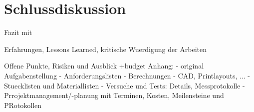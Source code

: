 \section{Schlussdiskussion}

Fazit mit

Erfahrungen, Lessons Learned, kritische Wuerdigung der Arbeiten

Offene Punkte, Risiken und Ausblick
+budget
Anhang:
- original Aufgabenstellung
- Anforderungslisten
- Berechnungen
- CAD, Printlayouts, ...
- Stuecklisten und Materiallisten
- Versuche und Tests: Details, Messprotokolle
- Prrojektmanagement/-planung mit Terminen, Kosten, Meilensteine und PRotokollen
